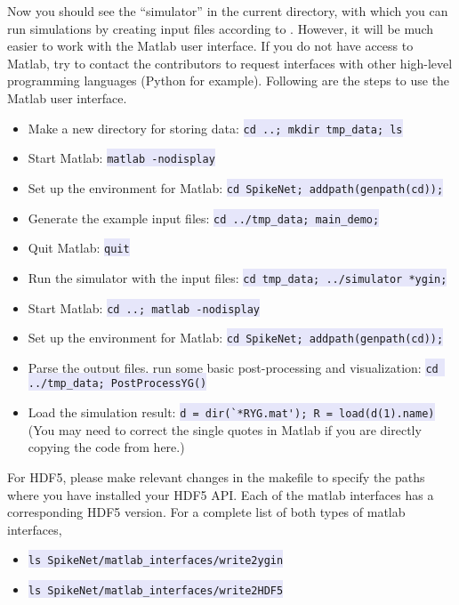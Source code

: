\documentclass{article}
\newcommand{\mylstinline}[1] {\colorbox{Lavender}{\lstinline[basicstyle=\ttfamily\footnotesize\color{Black}]|#1|} }
\begin{document}
Now you should see the ``simulator'' in the current directory, with which you can run simulations by creating input files according to .
However, it will be much easier to work with the Matlab user interface.
If you do not have access to Matlab, try to contact the contributors to request interfaces with other high-level programming languages (Python for example).
Following are the steps to use the Matlab user interface.
\begin{itemize}
\item Make a new directory for storing data: \mylstinline{cd ..; mkdir tmp_data; ls}
\item Start Matlab: \mylstinline{matlab -nodisplay}
\item Set up the environment for Matlab: \mylstinline{cd SpikeNet; addpath(genpath(cd));}
\item Generate the example input files: \mylstinline{cd ../tmp_data; main_demo;}
\item Quit Matlab: \mylstinline{quit}
\item Run the simulator with the input files: \mylstinline{cd tmp_data; ../simulator *ygin;}
\item Start Matlab: \mylstinline{cd ..; matlab -nodisplay}
\item Set up the environment for Matlab: \mylstinline{cd SpikeNet; addpath(genpath(cd));}
\item Parse the output files, run some basic post-processing and visualization: 
\newline \mylstinline{cd ../tmp_data; PostProcessYG()}
\item Load the simulation result: \mylstinline{d = dir(`*RYG.mat'); R = load(d(1).name)} (You may need to correct the single quotes in Matlab if you are directly copying the code from here.)
\end{itemize}

For HDF5, please make relevant changes in the makefile to specify the paths where you have installed your HDF5 API. Each of the matlab interfaces has a corresponding HDF5 version. For a complete list of both types of matlab interfaces,  
\begin{itemize}
\item \mylstinline{ls SpikeNet/matlab_interfaces/write2ygin}
\item \mylstinline{ls SpikeNet/matlab_interfaces/write2HDF5}
\end{itemize}
\end{document}
